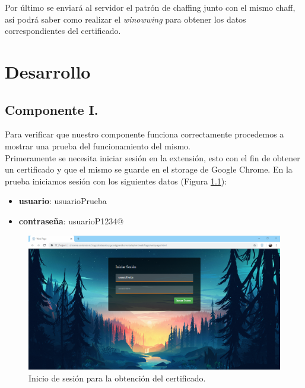 \documentclass[12pt, a4paper, titlepage]{report}
\begin{document}
    		    Por último se enviará al servidor el patrón de chaffing junto con el mismo chaff, así podrá saber como realizar el \textit{winowwing} para obtener los datos correspondientes del certificado.


			        
    \chapter{\textcolor{azulescom}{Desarrollo}}
        \section{Componente I.}
            Para verificar que nuestro componente funciona correctamente procedemos a mostrar una prueba del funcionamiento del mismo.\\ Primeramente se necesita iniciar sesión en la extensión, esto con el fin de obtener un certificado y que el mismo se guarde en el storage de Google Chrome. En la prueba iniciamos sesión con los siguientes datos (Figura \ref{fig:InicioDeSesion}): 
    
            \begin{itemize}
                \item \textbf{usuario}: usuarioPrueba
                \item \textbf{contraseña}: usuarioP1234@
            \end{itemize}
    
            \begin{figure}[H]
        		\begin{center}	\includegraphics[width=13cm]{./imagenes/Desarrollo/Componente_1/Version1/inicioSesion_prueba.PNG}
        			\caption{Inicio de sesión para la obtención del certificado.}
        		    \label{fig:InicioDeSesion}
        		\end{center}
        	\end{figure}
        	
\end{document}
